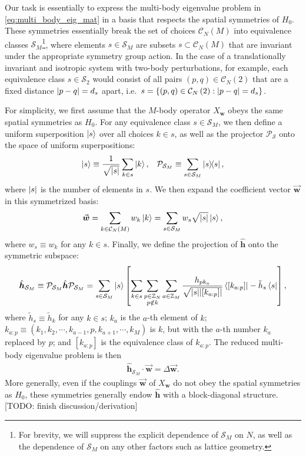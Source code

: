 \documentclass[nofootinbib,notitlepage,11pt]{revtex4-2}
\newcommand{\f}[2]{\dfrac{#1}{#2}} %
\newcommand{\p}[1]{\left(#1\right)} %
\renewcommand{\sp}[1]{\left[#1\right]} %
\renewcommand{\set}[1]{\left\{#1\right\}} %
\renewcommand{\c}{\cdot} %
\newcommand{\m}{\bm} %
\renewcommand{\v}{\vec} %
\newcommand{\1}{\mathds{1}}
\newcommand{\C}{\mathcal{C}}
\renewcommand{\P}{\mathcal{P}}
\renewcommand{\S}{\mathcal{S}}
\newcommand{\ZZ}{\mathbb{Z}}
\newcommand{\red}[1]{{\color{red} #1}}
\begin{document}
Our task is essentially to express the multi-body eigenvalue problem
in \eqref{eq:multi_body_eig_mat} in a basis that respects the spatial
symmetries of $H_0$.  These symmetries essentially break the set of
choices $\C_N\p{M}$ into equivalence classes $\S_M$\footnote{For
  brevity, we will suppress the explicit dependence of $\S_M$ on $N$,
  as well as the dependence of $\S_M$ on any other factors such as
  lattice geometry.}, where elements $s\in\S_M$ are subsets
$s\subset\C_N\p{M}$ that are invariant under the appropriate symmetry
group action.  In the case of a translationally invariant and
isotropic system with two-body perturbations, for example, each
equivalence class $s\in\S_2$ would consist of all pairs
$\p{p,q}\in\C_N\p{2}$ that are a fixed distance $\abs{p-q}=d_s$ apart,
i.e.~$s=\set{\p{p,q}\in\C_N\p{2}:\abs{p-q}=d_s}$.

For simplicity, we first assume that the $M$-body operator $X_{\m w}$
obeys the same spatial symmetries as $H_0$.  For any equivalence class
$s\in\S_M$, we then define a uniform superposition $\ket{s}$ over all
choices $k\in s$, as well as the projector $\P_\S$ onto the space of
uniform superpositions:
\begin{align}
  \ket{s} \equiv \f1{\sqrt{\abs{s}}} \sum_{k\in s} \ket{k},
  &&
  \P_{\S_M} \equiv \sum_{s\in\S_M} \op{s},
\end{align}
where $\abs{s}$ is the number of elements in $s$.  We then expand the
coefficient vector $\v{\m w}$ in this symmetrized basis:
\begin{align}
  \v{\m w} = \sum_{k\in\C_N\p{M}} w_k \ket{k}
  = \sum_{s\in\S_M} w_s \sqrt{\abs{s}} \ket{s},
\end{align}
where $w_s\equiv w_k$ for any $k\in s$.  Finally, we define the
projection of $\hat{\m h}$ onto the symmetric subspace:
\begin{align}
  \hat{\m h}_{\S_M}
  \equiv \P_{\S_M} \hat{\m h} \P_{\S_M}
  = \sum_{s\in\S_M} \ket{s} \sp{
    \sum_{k\in s} \sum_{\substack{p\in\ZZ_N\\p\notin k}} \sum_{a\in\ZZ_M}
    \f{h_{p k_a}}{\sqrt{\abs{s}\abs{\sp{k_{a:p}}}}} \bra{\sp{k_{a:p}}}
    - \tilde h_s \bra{s}},
\end{align}
where $\tilde h_s\equiv \tilde h_k$ for any $k\in s$; $k_a$ is the
$a$-th element of $k$;
$k_{a:p}\equiv\p{k_1,k_2,\cdots,k_{a-1},p,k_{a+1},\cdots,k_M}$ is $k$,
but with the $a$-th number $k_a$ replaced by $p$; and $\sp{k_{a:p}}$
is the equivalence class of $k_{a:p}$.  The reduced multi-body
eigenvalue problem is then
\begin{align}
  \hat{\m h}_{\S_M} \c \v{\m w} = \Delta \v{\m w}.
\end{align}
More generally, even if the couplings $\v{\m w}$ of $X_{\m w}$ do not
obey the spatial symmetries as $H_0$, these symmetries generally endow
$\hat{\m h}$ with a block-diagonal structure. \red{[TODO: finish
  discussion/derivation]}
\end{document}
